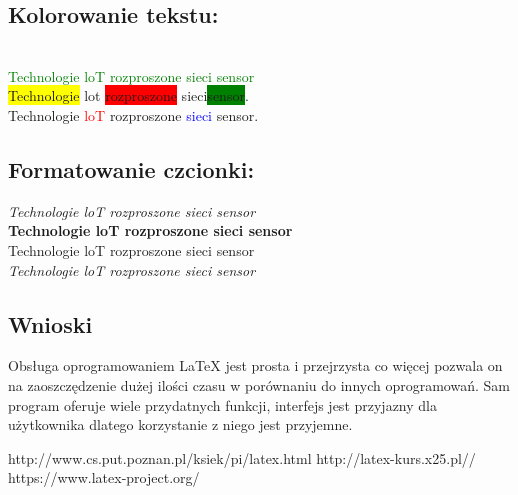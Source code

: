 \documentclass[12pt]{report}
\begin{document}
\subsection*{Kolorowanie tekstu:}
\fboxrule=0.5mm
\\
\textcolor{green}{Technologie loT rozproszone sieci sensor} \\
\colorbox{yellow}{Technologie} lot  \colorbox{red}{rozproszone} sieci\colorbox{green}{sensor}.\\
Technologie \textcolor{red}{loT} rozproszone \textcolor{blue}{sieci} sensor. \\
\subsection*{Formatowanie czcionki:}
\textit{Technologie loT rozproszone sieci sensor} \\
\textbf{Technologie loT rozproszone sieci sensor} \\
\textsf{Technologie loT rozproszone sieci sensor} \\
\textsl{Technologie loT rozproszone sieci sensor} \\
\subsection*{Wnioski}
Obsługa oprogramowaniem LaTeX jest prosta i przejrzysta co więcej pozwala on na zaoszczędzenie dużej ilości czasu w porównaniu do innych oprogramowań.
Sam program oferuje wiele przydatnych funkcji, interfejs jest przyjazny dla
użytkownika dlatego korzystanie z niego jest przyjemne. 

\begin{thebibliography}{}

\bibitem{}
http://www.cs.put.poznan.pl/ksiek/pi/latex.html
\bibitem{}
http://latex-kurs.x25.pl//
\bibitem{}
https://www.latex-project.org/
 \end{thebibliography}
\end{document}
